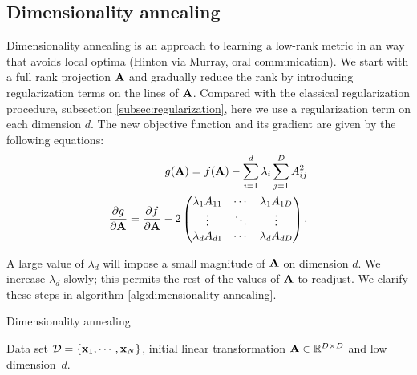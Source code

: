 \subsection{Dimensionality annealing}
\label{subsec:dimensionality-annealing}

  Dimensionality annealing is an approach to learning a low-rank metric in an way that avoids local optima (Hinton via Murray, oral communication). We start with a full rank projection $\mathbf{A}$ and gradually reduce the rank by introducing regularization terms on the lines of $\mathbf{A}$. Compared with the classical regularization procedure, subsection \ref{subsec:regularization}, here we use a regularization term on each dimension $d$. The new objective function and its gradient are given by the following equations:
    \begin{align}
            g(\mathbf{A}) = f(\mathbf{A}) - \sum_{i=1}^d\lambda_i\sum_{j=1}^D A_{ij}^2\\
            \frac{\partial g}{\partial \mathbf{A}} = \frac{\partial f}{\partial \mathbf{A}} - 2\begin{pmatrix}
                              \lambda_1A_{11} &  \cdots & \lambda_1A_{1D} \\
                              \vdots  &   \ddots & \vdots  \\
                              \lambda_dA_{d1} & \cdots & \lambda_dA_{dD}
                             \end{pmatrix}.
     \end{align}

  A large value of $\lambda_d$ will impose a small magnitude of $\mathbf{A}$ on dimension $d$. We increase $\lambda_d$ slowly; this permits the rest of the values of $\mathbf{A}$ to readjust. We clarify these steps in algorithm \ref{alg:dimensionality-annealing}.

  \begin{algorithm} 
	\caption{Dimensionality annealing} 
	\label{alg:dimensionality-annealing}  
	\begin{algorithmic} [1]                 %
		\REQUIRE Data set $\mathcal{D}=\{\mathbf{x}_1,\cdots,\mathbf{x}_N\}$, initial linear
transformation $\mathbf{A}\in\mathbb{R}^{D\times D}$ and low dimension~$d$.
		   \label{alg:dim-anneal-select-dim}
		  \ENDFOR
		\ENDFOR
	\end{algorithmic}
\end{algorithm}


